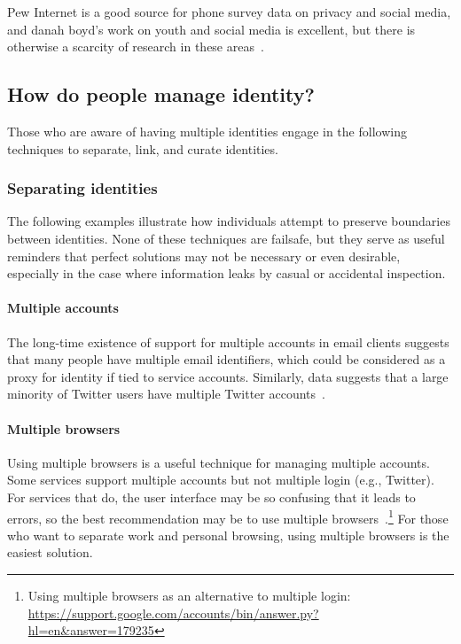 \documentclass[10pt, conference, compsocconf]{IEEEtran}
\begin{document}
Pew Internet is a good source for phone survey data on privacy and social
media, and danah boyd's work on youth and social media is excellent, but there
is otherwise a scarcity of research in these areas~\cite{boyd,pew1,pew2,pew3}.

\subsection{How do people manage identity?}

Those who are aware of having multiple identities engage in the following
techniques to separate, link, and curate identities.

\subsubsection{Separating identities}

The following examples illustrate how individuals attempt to preserve boundaries
between identities. None of these techniques are failsafe, but they serve as
useful reminders that perfect solutions may not be necessary or even desirable,
especially in the case where information leaks by casual or accidental
inspection.

\paragraph{Multiple accounts}
The long-time existence of support for multiple accounts in email clients
suggests that many people have multiple email identifiers, which could be
considered as a proxy for identity if tied to service accounts. Similarly, data
suggests that a large minority of Twitter users have multiple Twitter
accounts~\cite{twitter}.

\paragraph{Multiple browsers}

Using multiple browsers is a useful technique for managing multiple accounts.
Some services support multiple accounts but not multiple login (e.g.,
Twitter). For services that do, the user interface
may be so confusing that it leads to errors, so the best recommendation may be
to use multiple browsers~\cite{yegge}.\footnote{Using multiple
browsers as an alternative to multiple login:
\url{https://support.google.com/accounts/bin/answer.py?hl=en&answer=179235}}
For those who want to separate work and
personal browsing, using multiple browsers is the easiest solution.
\end{document}
